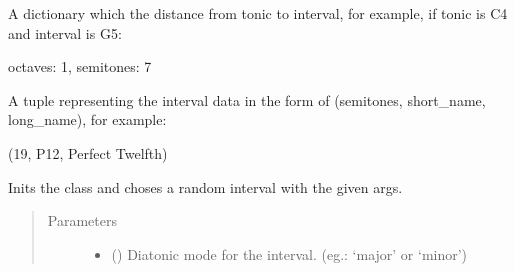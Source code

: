 \documentclass[letterpaper,10pt,english]{sphinxmanual}
\begin{document}
\begin{fulllineitems}
\begin{fulllineitems}
\end{fulllineitems}


\begin{fulllineitems}
\label{\detokenize{birdears:birdears.interval.DiatonicInterval.distance}}
 \textendash{} A dictionary which the distance from tonic to
interval, for example, if tonic is C4 and interval is G5:

\begin{sphinxVerbatim}[commandchars=\\\{\}]
\PYGZob{}
    \PYGZsq{}octaves\PYGZsq{}: 1,
    \PYGZsq{}semitones\PYGZsq{}: 7
\PYGZcb{}
\end{sphinxVerbatim}

\end{fulllineitems}


\begin{fulllineitems}
\label{\detokenize{birdears:birdears.interval.DiatonicInterval.data}}
 \textendash{} A tuple representing the interval data in the form of
(semitones, short\_name, long\_name), for example:

\begin{sphinxVerbatim}[commandchars=\\\{\}]
(19, \PYGZsq{}P12\PYGZsq{}, \PYGZsq{}Perfect Twelfth\PYGZsq{})
\end{sphinxVerbatim}

\end{fulllineitems}


\begin{fulllineitems}
\label{\detokenize{birdears:birdears.interval.DiatonicInterval.__init__}}
Inits the class and choses a random interval with the given args.
\begin{quote}\begin{description}
\item[{Parameters}] \leavevmode\begin{itemize}
\item {} 
 () \textendash{} Diatonic mode for the interval.
(eg.: ‘major’ or ‘minor’)


\end{itemize}
\end{description}
\end{quote}
\end{fulllineitems}
\end{fulllineitems}
\end{document}
